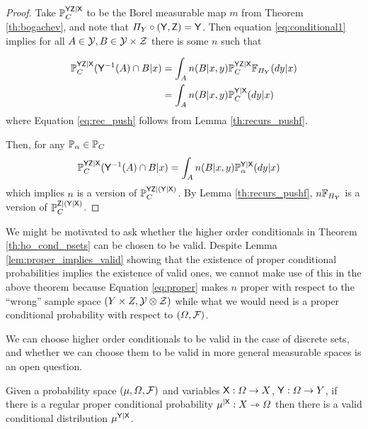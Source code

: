 \begin{proof}
Take $\mathbb{P}_C^{\mathsf{YZ}|\mathsf{X}}$ to be the Borel measurable map $m$ from Theorem \ref{th:bogachev}, and note that $\Pi_Y\circ (\mathsf{Y},\mathsf{Z})=\mathsf{Y}$. Then equation \ref{eq:conditional1} implies for all $A\in \mathcal{Y},B\in\mathcal{Y\times Z}$ there is some $n$ such that

\begin{align}
    \mathbb{P}_C^{\mathsf{YZ}|\mathsf{X}}(\mathsf{Y}^{-1}(A)\cap B|x) &= \int_A n(B|x,y) \mathbb{P}_C^{\mathsf{YZ}|\mathsf{X}}\mathbb{F}_{\Pi_Y}(dy|x)\\
    &=\int_A n(B|x,y) \mathbb{P}_C^{\mathsf{Y}|\mathsf{X}}(dy|x)\label{eq:rec_push}
\end{align}
where Equation \ref{eq:rec_push} follows from Lemma \ref{th:recurs_pushf}.

Then, for any $\mathbb{P}_\alpha\in\mathbb{P}_C$
\begin{align}
    \mathbb{P}_C^{\mathsf{YZ}|\mathsf{X}}(\mathsf{Y}^{-1}(A)\cap B|x) &= \int_A n(B|x,y) \mathbb{P}_{\alpha}^{\mathsf{Y}|\mathsf{X}}(dy|x)
\end{align}
which implies $n$ is a version of $\mathbb{P}_C^{\mathsf{YZ}|(\mathsf{Y}|\mathsf{X})}$. By Lemma \ref{th:recurs_pushf}, $n\mathbb{F}_{\Pi_Y}$ is a version of $\mathbb{P}_C^{\mathsf{Z}|(\mathsf{Y}|\mathsf{X})}$.
\end{proof}

We might be motivated to ask whether the higher order conditionals in Theorem \ref{th:ho_cond_psets} can be chosen to be valid. Despite Lemma \ref{lem:proper_implies_valid} showing that the existence of proper conditional probabilities implies the existence of valid ones, we cannot make use of this in the above theorem because Equation \ref{eq:proper} makes $n$ proper with respect to the ``wrong'' sample space $(Y\times Z, \mathcal{Y}\otimes\mathcal{Z})$ while what we would need is a proper conditional probability with respect to $(\Omega,\mathcal{F})$.

We can choose higher order conditionals to be valid in the case of discrete sets, and whether we can choose them to be valid in more general measurable spaces is an open question.

\begin{lemma}\label{lem:proper_implies_valid}
Given a probability space $(\mu,\Omega,\mathcal{F})$ and variables $\mathsf{X}:\Omega\to X$, $\mathsf{Y}:\Omega\to Y$, if there is a regular proper conditional probability $\mu^{|\mathsf{X}}:X\rightarrowtriangle \Omega$ then there is a valid conditional distribution $\mu^{\mathsf{Y}|\mathsf{X}}$.
\end{lemma}

